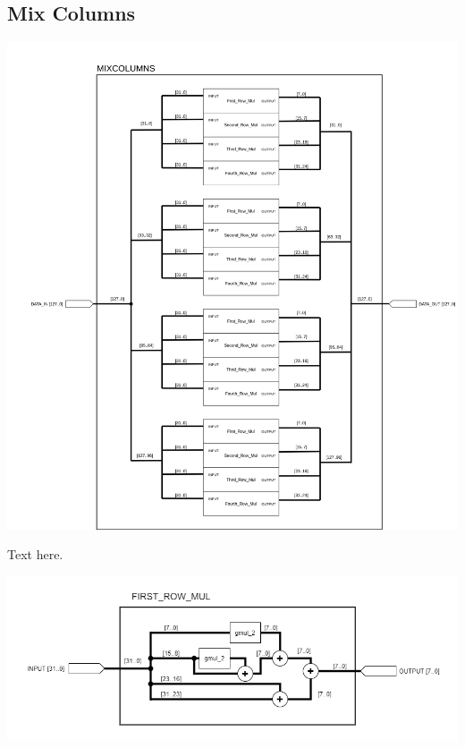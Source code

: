\documentclass[a4paper, 10pt]{article}
\newenvironment{Figure}
    {\par\medskip\noindent\minipage{\linewidth}}
    {\endminipage\par\medskip}
\begin{document}
\begin{multicols}{2}
            \subsection{Mix Columns}

            \noindent
            \begin{Figure}
                \centering
                \includegraphics[width=\linewidth]{MixColumns.png}
                \label{fig:mixcolumns}
            \end{Figure}

            Text here.

            \noindent
            \begin{Figure}
                \centering
                \includegraphics[width=\linewidth]{First_Row_Mul.png}
                \label{fig:first-col-mul}
            \end{Figure}


\end{multicols}
\end{document}
